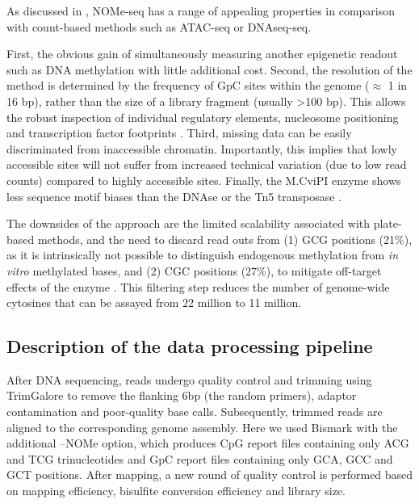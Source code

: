 As discussed in , NOMe-seq has a range of appealing properties in comparison with count-based methods such as ATAC-seq or DNAseq-seq.

First, the obvious gain of simultaneously measuring another epigenetic readout such as DNA methylation with little additional cost. Second, the resolution of the method is determined by the frequency of GpC sites within the genome ($\approx$ 1 in 16 bp), rather than the size of a library fragment (usually >100 bp). This allows the robust inspection of individual regulatory elements, nucleosome positioning and transcription factor footprints \cite{Kelly2012,Pott2016,Nordstrom2019}. Third, missing data can be easily discriminated from inaccessible chromatin. Importantly, this implies that lowly accessible sites will not suffer from increased technical variation (due to low read counts) compared to highly accessible sites. Finally, the M.CviPI enzyme shows less sequence motif biases than the DNAse or the Tn5 transposase \cite{Nordstrom2019}.

The downsides of the approach are the limited scalability associated with plate-based methods, and the need to discard read outs from (1) GCG positions (21\%), as it is intrinsically not possible to distinguish endogenous methylation from \textit{in vitro} methylated bases, and (2) CGC positions (27\%), to mitigate off-target effects of the enzyme \cite{Kelly2012}. This filtering step reduces the number of genome-wide cytosines that can be assayed from 22 million to 11 million. 


\subsection{Description of the data processing pipeline}
After DNA sequencing, reads undergo quality control and trimming using TrimGalore to remove the flanking 6bp (the random primers), adaptor contamination and poor-quality base calls. Subsequently, trimmed reads are aligned to the corresponding genome assembly. Here we used Bismark \cite{Krueger2011} with the additional --NOMe option, which produces CpG report files containing only ACG and TCG trinucleotides and GpC report files containing only GCA, GCC and GCT positions. After mapping, a new round of quality control is performed based on mapping efficiency, bisulfite conversion efficiency and library size.

